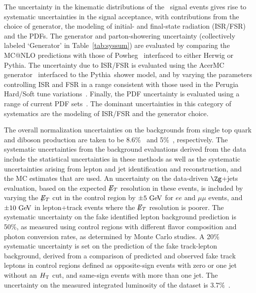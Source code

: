 The uncertainty in the kinematic distributions of the \ttbar\ signal events
gives rise to systematic uncertainties in
the signal acceptance, with contributions from the choice of generator, the modeling of initial- and final-state
radiation (ISR/FSR) and the PDFs.
The generator and parton-showering uncertainty (collectively labeled
`Generator' in Table~\ref{tab:syssum}) are evaluated by comparing the
{\sc MC@NLO} predictions  with those of
{\sc Powheg}~\cite{powheg,Frixione:2007vw,Alioli:2010xd} interfaced to
either {\sc Herwig} or {\sc Pythia}.
The uncertainty due to ISR/FSR is evaluated using the {\sc AcerMC} generator~\cite{Acer}
interfaced to the {\sc Pythia}\ shower model, and by varying the parameters controlling ISR
and FSR in a range consistent with those used in the Perugia Hard/Soft tune variations~\cite{Skands}.
Finally, the PDF uncertainty is evaluated using a range of
current PDF sets~\cite{cteq6l}.
The dominant uncertainties in this category of systematics are the
modeling of ISR/FSR and the generator choice.

The overall normalization uncertainties on the backgrounds from
single top quark and diboson production are taken to be
8.6\%~\cite{PhysRevD.83.091503} and 5\%~\cite{Campbell:2010ff},
respectively.
%
The systematic uncertainties from the background evaluations derived from the data include the statistical uncertainties in these methods as well as the systematic uncertainties arising from lepton and jet identification and reconstruction, and the MC estimates that are used.
An uncertainty on the data-driven $\Zg$+jets evaluation, based on the
expected $\not\!\!{E_{T}}$ resolution in these events, is included by varying the
$\not\!\!{E_{T}}$ cut in the control region by $\pm 5\GeV$ for $ee$ and $\mu\mu$
events, and $\pm 10\GeV$ in lepton+track events where the $\not\!\!{E_{T}}$
resolution is poorer.
The systematic uncertainty on the fake identified lepton background prediction is 50\%, as measured using control regions with different flavor composition and photon conversion rates, as determined by Monte Carlo studies. A 20\% systematic uncertainty is set on the prediction of the fake track-lepton background, derived from a comparison of predicted and observed fake track leptons in control
regions defined as opposite-sign events with zero or one jet without an $H_{\mathrm{T}}$ cut, and same-sign events with more than one jet.
%
The uncertainty on the measured integrated luminosity of the dataset
is 3.7\%~\cite{lumi}.

